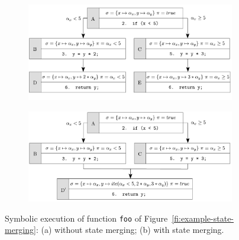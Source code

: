 \begin{figure}[t]
  \vspace{-3mm}
  \centering
  \begin{subfigure}{.5\textwidth}
    \centering
    \hspace{-5mm}
    \includegraphics[width=1.05\columnwidth]{images/state-merging} 
    \vspace{-6.5mm}
    \caption{}
  \end{subfigure}%
  \begin{subfigure}{.5\textwidth}
    \centering
    \includegraphics[width=1.05\columnwidth]{images/state-merging-2} 
    \vspace{-4mm}
    \caption{}
  \end{subfigure}
  \vspace{-3mm}
  \caption{Symbolic execution of function \texttt{foo} of Figure~\ref{fi:example-state-merging}: (a) without state merging; (b) with state merging.}
  \label{fig:example-state-merging}
\end{figure}

